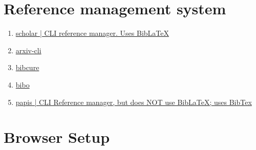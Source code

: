 \documentclass{article}
\begin{document}
\section{Reference management system}
\begin{enumerate}
    \item \href{https://github.com/cgxeiji/scholar/}{scholar | CLI reference manager. Uses BibLaTeX}
    \item \href{https://github.com/jacquerie/arxiv-cli}{arxiv-cli}
    \item \href{https://github.com/bibcure/bibcure}{bibcure}
    \item \href{https://github.com/Nagasaki45/bibo}{bibo}
    \item \href{https://github.com/papis/papis}{papis | CLI Reference manager, but does NOT use BibLaTeX; uses BibTex}
\end{enumerate}

\section{Browser Setup}
\end{document}
